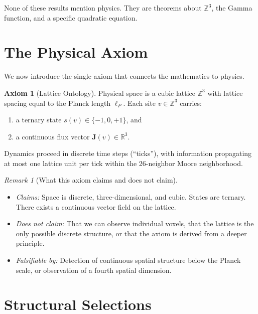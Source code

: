 \documentclass[12pt]{article}
\theoremstyle{definition}
\newtheorem{axiom}[theorem]{Axiom}
\theoremstyle{remark}
\newtheorem{remark}[theorem]{Remark}
\begin{document}
None of these results mention physics. They are theorems about $\mathbb{Z}^3$, the Gamma function, and a specific quadratic equation.

\section{The Physical Axiom}
\label{sec:axiom}

We now introduce the single axiom that connects the mathematics to physics.

\begin{axiom}[Lattice Ontology]
\label{ax:lattice}
Physical space is a cubic lattice $\mathbb{Z}^3$ with lattice spacing equal to the Planck length $\ell_P$. Each site $v \in \mathbb{Z}^3$ carries:
\begin{enumerate}[nosep]
    \item a ternary state $s(v) \in \{-1, 0, +1\}$, and
    \item a continuous flux vector $\mathbf{J}(v) \in \mathbb{R}^3$.
\end{enumerate}
Dynamics proceed in discrete time steps (``ticks''), with information propagating at most one lattice unit per tick within the 26-neighbor Moore neighborhood.
\end{axiom}

\begin{remark}[What this axiom claims and does not claim]
\mbox{}
\begin{itemize}[nosep]
    \item \emph{Claims:} Space is discrete, three-dimensional, and cubic. States are ternary. There exists a continuous vector field on the lattice.
    \item \emph{Does not claim:} That we can observe individual voxels, that the lattice is the only possible discrete structure, or that the axiom is derived from a deeper principle.
    \item \emph{Falsifiable by:} Detection of continuous spatial structure below the Planck scale, or observation of a fourth spatial dimension.
\end{itemize}
\end{remark}

\section{Structural Selections}
\label{sec:selections}
\end{document}
